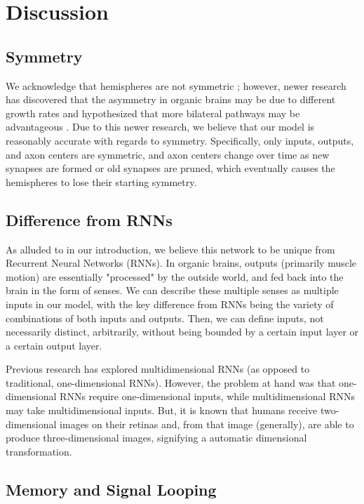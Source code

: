 \documentclass[12pt]{article}
\begin{document}
\newpage

\section{Discussion}

\subsection{Symmetry}

We acknowledge that hemispheres are not symmetric \cite{hemisphereasymmetry}; however, newer research has discovered that the asymmetry in organic brains may be due to different growth rates \cite{hemispheredev} and hypothesized that more bilateral pathways may be advantageous \cite{recallasymmetry}.  Due to this newer research, we believe that our model is reasonably accurate with regards to symmetry.  Specifically, only inputs, outputs, and axon centers are symmetric, and axon centers change over time as new synapses are formed or old synapses are pruned, which eventually causes the hemispheres to lose their starting symmetry.

\subsection{Difference from RNNs}

As alluded to in our introduction, we believe this network to be unique from Recurrent Neural Networks (RNNs).  In organic brains, outputs (primarily muscle motion) are essentially "processed" by the outside world, and fed back into the brain in the form of senses.  We can describe these multiple senses as multiple inputs in our model, with the key difference from RNNs being the variety of combinations of both inputs and outputs.  Then, we can define inputs, not necessarily distinct, arbitrarily, without being bounded by a certain input layer or a certain output layer.

Previous research has explored multidimensional RNNs \cite{dimensionalrnn} (as opposed to traditional, one-dimensional RNNs).  However, the problem at hand was that one-dimensional RNNs require one-dimensional inputs, while multidimensional RNNs may take multidimensional inputs.  But, it is known that humans receive two-dimensional images on their retinas and, from that image (generally), are able to produce three-dimensional images, signifying a automatic dimensional transformation.

\subsection{Memory and Signal Looping}
\end{document}
